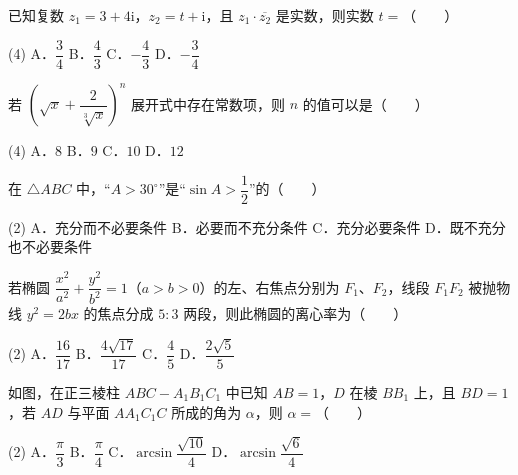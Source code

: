 \begin{question}
已知复数 $z_1 = 3 + 4\mathrm{i}$，$z_2 = t + \mathrm{i}$，且 $z_1 \cdot \overline{z_2}$ 是实数，则实数 $t =$\mbox{（　　）}

\begin{gkopts}(4)
\task A．$\dfrac{3}{4}$
\task B．$\dfrac{4}{3}$
\task C．$-\dfrac{4}{3}$
\task D．$-\dfrac{3}{4}$
\end{gkopts}

\end{question}
\begin{question}
若 $\left(\sqrt{x} + \dfrac{2}{\sqrt[3]{x}}\right)^n$ 展开式中存在常数项，则 $n$ 的值可以是\mbox{（　　）}

\begin{gkopts}(4)
\task A．$8$
\task B．$9$
\task C．$10$
\task D．$12$
\end{gkopts}

\end{question}
\begin{question}
在 $\triangle ABC$ 中，“$A > 30^\circ$”是“$\sin A > \dfrac{1}{2}$”的\mbox{（　　）}

\begin{gkopts}(2)
\task A．充分而不必要条件
\task B．必要而不充分条件
\task C．充分必要条件
\task D．既不充分也不必要条件
\end{gkopts}

\end{question}
\begin{question}
若椭圆 $\dfrac{x^2}{a^2} + \dfrac{y^2}{b^2} = 1$（$a > b > 0$）的左、右焦点分别为 $F_1$、$F_2$，线段 $F_1 F_2$ 被抛物线 $y^2 = 2bx$ 的焦点分成 $5 : 3$ 两段，则此椭圆的离心率为\mbox{（　　）}

\begin{gkopts}(2)
\task A．$\dfrac{16}{17}$
\task B．$\dfrac{4\sqrt{17}}{17}$
\task C．$\dfrac{4}{5}$
\task D．$\dfrac{2\sqrt{5}}{5}$
\end{gkopts}

\Needspace{0.4\textheight}
\end{question}
\begin{question}
如图，在正三棱柱 $ABC - A_1B_1C_1$ 中已知 $AB = 1$，$D$ 在棱 $BB_1$ 上，且 $BD = 1$，若 $AD$ 与平面 $AA_1C_1C$ 所成的角为 $\alpha$，则 $\alpha =$\mbox{（　　）}
\nopagebreak[4]
\begin{center}\end{center}
\nopagebreak[4]
\begin{gkopts}(2)
\task A．$\dfrac{\pi}{3}$
\task B．$\dfrac{\pi}{4}$
\task C．$\arcsin\dfrac{\sqrt{10}}{4}$
\task D．$\arcsin\dfrac{\sqrt{6}}{4}$
\end{gkopts}

\Needspace{0.4\textheight}
\end{question}
